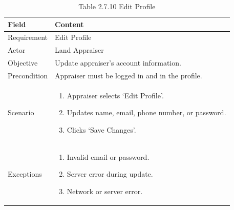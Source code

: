 \documentclass[12pt,oneside]{report}
\begin{document}
\begin{table}[H]
\centering
\caption{Table 2.7.10 Edit Profile}
\label{tab:req-edit-profile}
\begin{tabularx}{\textwidth}{|p{3cm}|X|}
\hline
\textbf{Field} & \textbf{Content} \\ \hline

Requirement & Edit Profile \\ \hline

Actor & Land Appraiser \\ \hline

Objective & Update appraiser’s account information. \\ \hline

Precondition & Appraiser must be logged in and in the profile. \\ \hline

Scenario & 
\begin{minipage}[t]{0.75\textwidth}
\begin{enumerate}[leftmargin=*,label=\arabic*.]
\item Appraiser selects ‘Edit Profile’.
\item Updates name, email, phone number, or password.
\item Clicks ‘Save Changes’.
\end{enumerate}
\end{minipage} \\ \hline

Exceptions & 
\begin{minipage}[t]{0.75\textwidth}
\begin{enumerate}[leftmargin=*,label=\arabic*.]
\item Invalid email or password.
\item Server error during update.
\item Network or server error.
\end{enumerate}
\end{minipage} \\ \hline
\end{tabularx}
\end{table}
\end{document}

